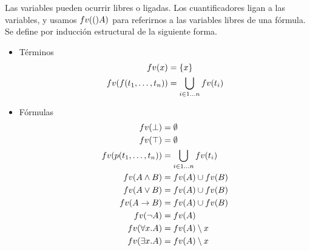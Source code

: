 \begin{definition}
    Las variables pueden ocurrir libres o ligadas. Los cuantificadores ligan a
    las variables, y usamos $fv(()A)$ para referirnos a las variables libres
    de una fórmula. Se define por inducción estructural de la siguiente forma.

    \begin{itemize}
        \item Términos
        \begin{align*}
            fv(x) &= \{ x \}\\
            fv(f(t_1, \dots, t_n)) &= \bigcup_{i \in 1\dots n} fv(t_i) 
        \end{align*}
    
        \item Fórmulas
        \begin{align*}
            fv(\bot) &=\emptyset\\
            fv(\top) &=\emptyset \\
            fv(p(t_1, \dots, t_n)) &= \bigcup_{i \in 1\dots n} fv(t_i) \\
            fv(A \wedge B) &= fv(A) \cup fv(B)\\
            fv(A \vee B) &=fv(A) \cup fv(B)\\
            fv(A \to B) &=fv(A) \cup fv(B)\\
            fv(\neg A) &=fv(A)\\
            fv(\forall x . A) &= fv(A) \setminus x \\
            fv(\exists x . A) &= fv(A) \setminus x
        \end{align*}
    \end{itemize}
\end{definition}